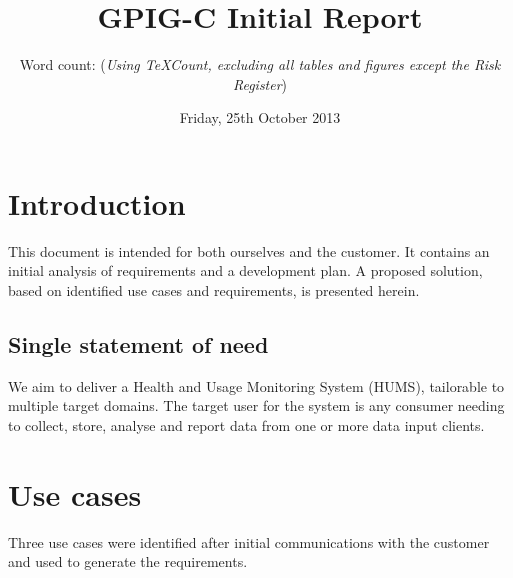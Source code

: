 \documentclass[10pt,a4paper]{article}
\begin{document}
\vspace{-1cm}\author{Word count:  (\textit{Using TeXCount, excluding all tables and figures except the Risk Register})}
\title{\vspace{-2cm}GPIG-C Initial Report}
\date{\vspace{-2cm}Friday, 25th October 2013}
\maketitle
\thispagestyle{fancy} %


\section{Introduction} %
This document is intended for both ourselves and the customer. It contains
an initial analysis of requirements and a development plan. A proposed solution,
based on identified use cases and requirements, is presented herein.
 
\subsection{Single statement of need} %
We aim to deliver a Health and Usage Monitoring System (HUMS), tailorable to
multiple target domains. The target user for the system is any consumer needing
to collect, store, analyse and report data from one or more data input clients.


\section{Use cases}
Three use cases were identified after initial communications with the customer and used to generate the requirements. 
\end{document}
